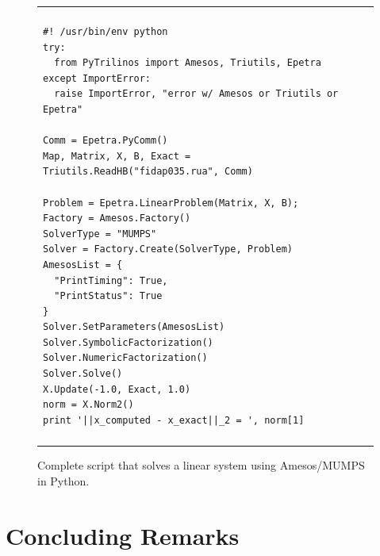 \documentclass[acmtocl]{acmtrans2m}
\newcommand{\amesos}{{\sc Amesos}}
\begin{document}
\begin{figure}
\begin{center}
\begin{tabular}{| p{12cm} |}
\hline
\\
\footnotesize
\begin{minipage}{11.5cm}
\begin{verbatim}
#! /usr/bin/env python
try:
  from PyTrilinos import Amesos, Triutils, Epetra
except ImportError:
  raise ImportError, "error w/ Amesos or Triutils or Epetra"

Comm = Epetra.PyComm()
Map, Matrix, X, B, Exact = Triutils.ReadHB("fidap035.rua", Comm)

Problem = Epetra.LinearProblem(Matrix, X, B);
Factory = Amesos.Factory()
SolverType = "MUMPS"
Solver = Factory.Create(SolverType, Problem)
AmesosList = {
  "PrintTiming": True,
  "PrintStatus": True
}
Solver.SetParameters(AmesosList)
Solver.SymbolicFactorization()
Solver.NumericFactorization()
Solver.Solve()
X.Update(-1.0, Exact, 1.0)
norm = X.Norm2()
print '||x_computed - x_exact||_2 = ', norm[1]
\end{verbatim}
\end{minipage}
\\
\\
\hline
\end{tabular}
\caption{Complete script that solves a linear system using \amesos/MUMPS in
  Python.}
\label{fig:pyamesos}
\end{center}
\end{figure}

\section{Concluding Remarks}
\label{sec:conclusions}
\end{document}

